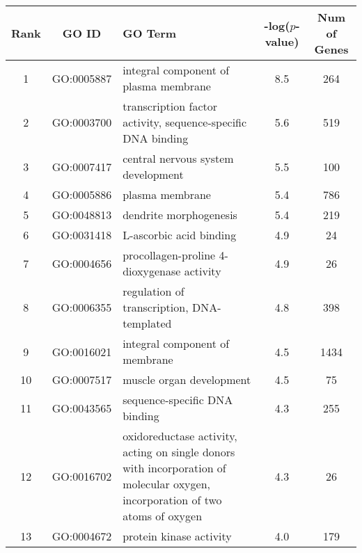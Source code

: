 \centering \begin{tabular}{c|c|p{4in}|c|c}
Rank	&GO ID	&GO Term	&-log($p$-value)	&Num of Genes\\\hline
1	&GO:0005887	&integral component of plasma membrane	&8.5	&264\\
2	&GO:0003700	&transcription factor activity, sequence-specific DNA binding	&5.6	&519\\
3	&GO:0007417	&central nervous system development	&5.5	&100\\
4	&GO:0005886	&plasma membrane	&5.4	&786\\
5	&GO:0048813	&dendrite morphogenesis	&5.4	&219\\
6	&GO:0031418	&L-ascorbic acid binding	&4.9	&24\\
7	&GO:0004656	&procollagen-proline 4-dioxygenase activity	&4.9	&26\\
8	&GO:0006355	&regulation of transcription, DNA-templated	&4.8	&398\\
9	&GO:0016021	&integral component of membrane	&4.5	&1434\\
10	&GO:0007517	&muscle organ development	&4.5	&75\\
11	&GO:0043565	&sequence-specific DNA binding	&4.3	&255\\
12	&GO:0016702	&oxidoreductase activity, acting on single donors with incorporation of molecular oxygen, incorporation of two atoms of oxygen	&4.3	&26\\
13	&GO:0004672	&protein kinase activity	&4.0	&179\\
\end{tabular}
